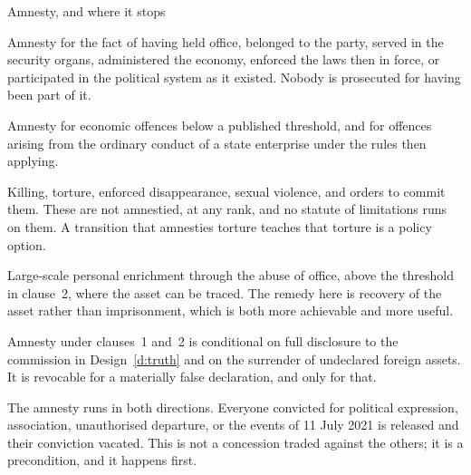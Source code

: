 \begin{design}{Amnesty, and where it stops}
\label{d:amnesty}
\begin{rules}
 Amnesty for the fact of having held office, belonged to the
party, served in the security organs, administered the economy, enforced the
laws then in force, or participated in the political system as it existed.
Nobody is prosecuted for having been part of it.

 Amnesty for economic offences below a published threshold, and
for offences arising from the ordinary conduct of a state enterprise under the
rules then applying.

 Killing, torture, enforced disappearance, sexual violence,
and orders to commit them. These are not amnestied, at any rank, and no statute
of limitations runs on them. A transition that amnesties torture teaches that
torture is a policy option.

 Large-scale personal enrichment through the abuse of
office, above the threshold in clause~2, where the asset can be traced. The
remedy here is recovery of the asset rather than imprisonment, which is both
more achievable and more useful.

 Amnesty under clauses~1 and~2 is conditional on full
disclosure to the commission in Design~\ref{d:truth} and on the surrender
of undeclared foreign assets. It is revocable for a materially false
declaration, and only for that.

 The amnesty runs in both directions. Everyone convicted for
political expression, association, unauthorised departure, or the events of 11
July 2021 is released and their conviction vacated. This is not a concession
traded against the others; it is a precondition, and it happens first.
\end{rules}
\end{design}

